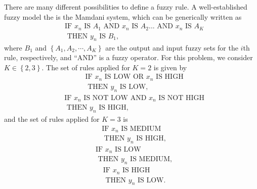 \documentclass[english]{sobraep}
\begin{document}
There are many different possibilities to define a fuzzy rule. A well-established fuzzy model the is the Mamdani system, which can be generically written as
\begin{align}
    &\text{IF } x_n \text{ IS } A_1 \text{ AND } x_n \text{ IS } A_2 ... \text{ AND } x_n \text{ IS } A_K \nonumber \\
    &\text{ THEN } y_n \text{ IS } B_1, \nonumber
\end{align}
where \(B_1\) and \(\left\{ A_1, A_2, \cdots, A_K \right\}\) are the output and input fuzzy sets for the \(i\)th rule, respectively, and ``AND'' is a fuzzy operator. For this problem, we consider \(K \in \left\{ 2,3 \right\}\). The set of rules applied for \(K=2\) is given by
\begin{align}
    &\text{IF } x_n \text{ IS LOW OR } x_n \text{ IS HIGH} \nonumber \\
    &\text{ THEN } y_n \text{ IS LOW}, \nonumber
\end{align}
\begin{align}
    &\text{IF } x_n \text{ IS NOT LOW AND } x_n \text{ IS NOT HIGH} \nonumber \\
    &\text{ THEN } y_n \text{ IS HIGH}, \nonumber
\end{align}
and the set of rules applied for \(K=3\) is
\begin{align}
    &\text{IF } x_n \text{ IS MEDIUM} \nonumber \\
    &\text{ THEN } y_n \text{ IS HIGH}, \nonumber
\end{align}
\begin{align}
    &\text{IF } x_n \text{ IS LOW} \nonumber \\
    &\text{ THEN } y_n \text{ IS MEDIUM}, \nonumber
\end{align}
\begin{align}
    &\text{IF } x_n \text{ IS HIGH} \nonumber \\
    &\text{ THEN } y_n \text{ IS LOW}. \nonumber
\end{align}
\end{document}

